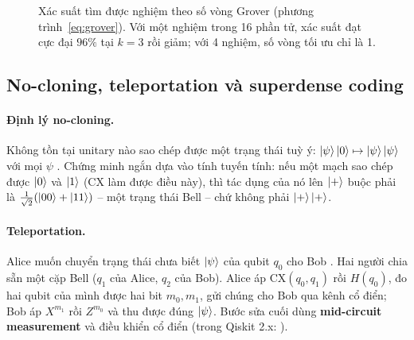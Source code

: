 \begin{figure}[h]
  \centering
  \caption{Xác suất tìm được nghiệm theo số vòng Grover (phương trình~\eqref{eq:grover}). Với một
  nghiệm trong 16 phần tử, xác suất đạt cực đại $96\%$ tại $k=3$ rồi giảm; với 4 nghiệm, số vòng
  tối ưu chỉ là 1.}
  \label{fig:grover-prob}
\end{figure}

\subsection{No-cloning, teleportation và superdense coding}

\paragraph{Định lý no-cloning.} Không tồn tại unitary nào sao chép được một trạng thái tuỳ ý:
$\ket{\psi}\ket{0}\mapsto\ket{\psi}\ket{\psi}$ với mọi $\psi$ \cite{wootters1982}. Chứng minh ngắn
dựa vào tính tuyến tính: nếu một mạch sao chép được $\ket{0}$ và $\ket{1}$ (CX làm được điều này),
thì tác dụng của nó lên $\ket{+}$ buộc phải là $\frac{1}{\sqrt2}(\ket{00}+\ket{11})$ -- một trạng thái
Bell -- chứ không phải $\ket{+}\ket{+}$.

\paragraph{Teleportation.} Alice muốn chuyển trạng thái chưa biết $\ket{\psi}$ của qubit $q_0$ cho Bob
\cite{bennett1993teleport}. Hai người chia sẵn một cặp Bell ($q_1$ của Alice, $q_2$ của Bob). Alice
áp CX$(q_0,q_1)$ rồi $H(q_0)$, đo hai qubit của mình được hai bit $m_0, m_1$, gửi chúng cho Bob qua
kênh cổ điển; Bob áp $X^{m_1}$ rồi $Z^{m_0}$ và thu được đúng $\ket{\psi}$. Bước sửa cuối dùng
\textbf{mid-circuit measurement} và điều khiển cổ điển (trong Qiskit 2.x: ).

